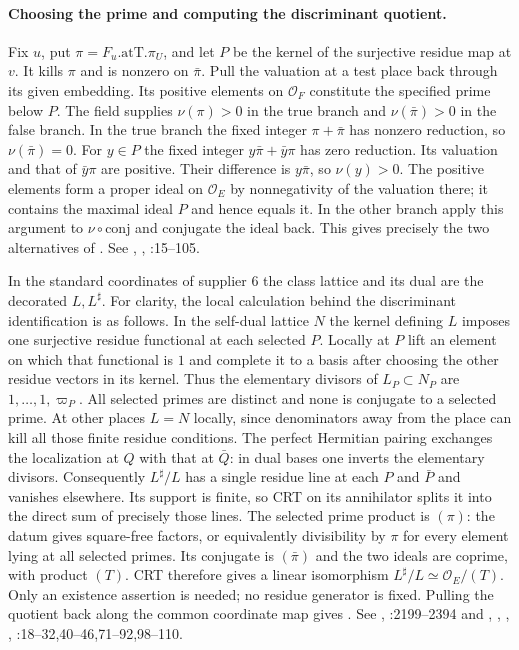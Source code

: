 \paragraph{Choosing the prime and computing the discriminant quotient.}
Fix $u$, put $\pi=F_u.\mathrm{atT}.\pi_U$, and let $P$ be the kernel of
the surjective residue map at $v$. It kills $\pi$ and is nonzero on $\bar\pi$.
Pull the valuation at a test place back through its given embedding.
Its positive elements on $\mathcal O_F$ constitute the specified prime
below $P$. The field  supplies $\nu(\pi)>0$ in the true branch and $\nu(\bar\pi)>0$ in the false branch. In the true branch the fixed integer $\pi+\bar\pi$ has
nonzero reduction, so $\nu(\bar\pi)=0$. For $y\in P$ the fixed
integer $y\bar\pi+\bar y\pi$ has zero reduction. Its valuation and
that of $\bar y\pi$ are positive. Their difference is $y\bar\pi$,
so $\nu(y)>0$. The positive elements form a proper ideal on
$\mathcal O_E$ by nonnegativity of the valuation there; it contains the
maximal ideal $P$ and hence equals it. In the other branch apply this
argument to $\nu\circ\mathrm{conj}$ and conjugate the ideal back.
This gives precisely the two alternatives of .
See , ,
:15--105.

In the standard coordinates of supplier 6 the class lattice and its dual
are the decorated $L,L^\sharp$. For clarity, the local calculation behind
the discriminant identification is as follows. In the self-dual lattice
$N$ the kernel defining $L$ imposes one surjective residue functional
at each selected $P$. Locally at $P$ lift an element on which that
functional is $1$ and complete it to a basis after choosing the other
residue vectors in its kernel. Thus the elementary divisors of
$L_P\subset N_P$ are $1,\ldots,1,\varpi_P$.
All selected primes are distinct and none is conjugate to a selected
prime. At other places $L=N$ locally, since denominators away from the
place can kill all those finite residue conditions. The perfect
Hermitian pairing exchanges the localization at $Q$ with that at
$\bar Q$: in dual bases one inverts the elementary divisors. Consequently
$L^\sharp/L$ has a single residue line at each $P$ and $\bar P$
and vanishes elsewhere. Its support is finite, so CRT on its annihilator
splits it into the direct sum of precisely those lines. The selected
prime product is $(\pi)$: the datum gives square-free factors, or
equivalently divisibility by $\pi$ for every element lying at all
selected primes. Its conjugate is $(\bar\pi)$ and the two ideals are
coprime, with product $(T)$. CRT therefore gives a linear isomorphism
$L^\sharp/L\simeq\mathcal O_E/(T)$. Only an existence assertion is
needed; no residue generator is fixed. Pulling the quotient back along
the common coordinate map gives . See ,
:2199--2394 and
, , , ,
:18--32,40--46,71--92,98--110.

